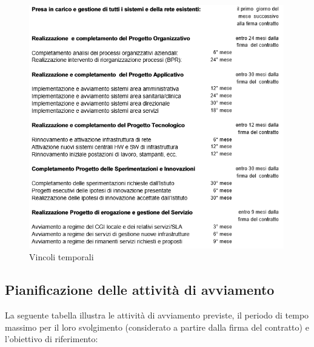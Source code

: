 \begin{figure}[H]
\centering
\includegraphics[width=30em]{immagini/sla/timeconstraints.png}
\caption{Vincoli temporali}
\end{figure}

\subsection{Pianificazione delle attività di avviamento}

La seguente tabella illustra le attività di avviamento previste, il periodo di tempo massimo per il loro svolgimento (considerato a partire dalla firma del contratto) e l'obiettivo di riferimento:

